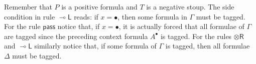 \documentclass[copyright,creativecommons]{eptcs}
\theoremstyle{definition}
\newcommand{\tr}{\otimes \mathsf{R}}
\newcommand{\lleft}{{\multimap}\mathsf{L}}
\newcommand{\pass}{\mathsf{pass}}
\newcommand{\RI}{\mathsf{RI}}
\newcommand{\Pass}{\mathsf{P}}
\newcommand{\F}{\mathsf{F}}
\begin{document}
Remember that $P$ is a positive formula and $T$ is a negative stoup. The side condition in rule $\lleft$ reads: if $x = \bullet$, then some formula in $\Gamma$ must be tagged. For the rule $\pass$ notice that, if $x = \bullet$, it is actually forced that all formulae of $\Gamma$ are tagged since the preceding context formula $A^\bullet$ is tagged. For the rules $\tr$ and $\lleft$ similarly notice that, 
if some formula of $\Gamma$ is tagged, then all formulae $\Delta$ must be tagged. 

\end{document}

